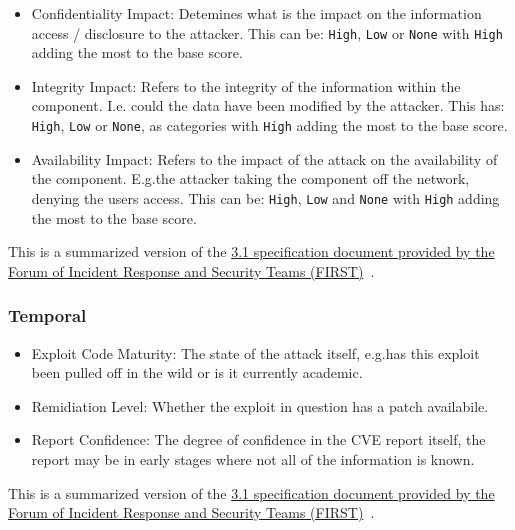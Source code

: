 \documentclass[12pt]{article}
\begin{document}
\begin{itemize}
	\item Confidentiality Impact: Detemines what is the impact on the information access /
	      disclosure to the attacker. This can be: \texttt{High}, \texttt{Low} or \texttt{None} with
	      \texttt{High} adding the most to the base score.

	\item Integrity Impact: Refers to the integrity of the information within the component. I.e.\@
	      could the data have been modified by the attacker. This has: \texttt{High}, \texttt{Low} or
	      \texttt{None}, as categories with \texttt{High} adding the most to the base score.

	\item Availability Impact: Refers to the impact of the attack on the availability of the
	      component. E.g.\@ the attacker taking the component off the network, denying the users
	      access. This can be: \texttt{High}, \texttt{Low} and \texttt{None} with \texttt{High} adding
	      the most to the base score.

\end{itemize}

{\footnotesize This is a summarized version of the
\href{https://www.first.org/cvss/v3.1/specification-document}{3.1 specification document
	provided by the  Forum of Incident Response and Security Teams (FIRST)}~\cite{CVSS_31}. } \\


\subsubsection*{Temporal}

\begin{itemize}

	\item Exploit Code Maturity: The state of the attack itself, e.g.\@ has this exploit been pulled
	      off in the wild or is it currently academic.

	\item Remidiation Level: Whether the exploit in question has a patch availabile.

	\item Report Confidence: The degree of confidence in the CVE report itself, the report may be in
	      early stages where not all of the information is known.

\end{itemize}

{\footnotesize This is a summarized version of the
\href{https://www.first.org/cvss/v3.1/specification-document}{3.1 specification document
	provided by the Forum of Incident Response and Security Teams (FIRST)}~\cite{CVSS_31}.}  \\
\bigskip
\end{document}
